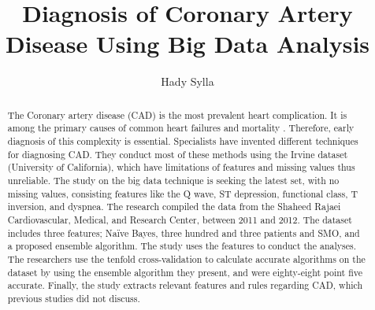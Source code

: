 \documentclass[sigconf]{acmart}
\begin{document}
\title{Diagnosis of Coronary Artery Disease Using Big Data Analysis}
\author{Hady Sylla}



\begin{abstract}
The Coronary artery disease (CAD) is the most prevalent heart complication. It is among the primary causes of common heart failures and mortality \cite{ali}. Therefore, early diagnosis of this complexity is essential. Specialists have invented different techniques for diagnosing CAD. They conduct most of these methods using the Irvine dataset (University of California), which have limitations of features and missing values thus unreliable. The study on the big data technique is seeking the latest set, with no missing values, consisting features like the Q wave, ST depression, functional class, T inversion, and dyspnea. The research compiled the data from the Shaheed Rajaei Cardiovascular, Medical, and Research Center, between 2011 and 2012. The dataset includes three features; Naïve Bayes, three hundred and three patients and SMO, and a proposed ensemble algorithm. The study uses the features to conduct the analyses. The researchers use the tenfold cross-validation to calculate accurate algorithms on the dataset by using the ensemble algorithm they present, and were eighty-eight point five accurate. Finally, the study extracts relevant features and rules regarding CAD, which previous studies did not discuss.

\end{abstract}


\maketitle
\end{document}
